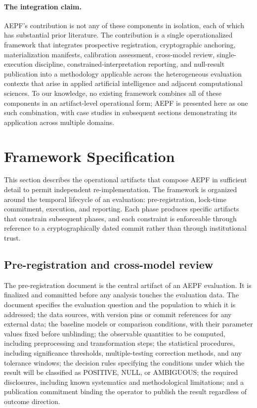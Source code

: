 \documentclass[11pt]{article}
\begin{document}
\paragraph{The integration claim.}
AEPF's contribution is not any of these components in isolation,
each of which has substantial prior literature. The contribution is
a single operationalized framework that integrates prospective
registration, cryptographic anchoring, materialization manifests,
calibration assessment, cross-model review, single-execution
discipline, constrained-interpretation reporting, and null-result
publication into a methodology applicable across the heterogeneous
evaluation contexts that arise in applied artificial intelligence
and adjacent computational sciences. To our knowledge, no existing
framework combines all of these components in an artifact-level
operational form; AEPF is presented here as one such combination,
with case studies in subsequent sections demonstrating its
application across multiple domains.

\section{Framework Specification}
\label{sec:framework-spec}

This section describes the operational artifacts that compose AEPF in
sufficient detail to permit independent re-implementation. The
framework is organized around the temporal lifecycle of an evaluation:
pre-registration, lock-time commitment, execution, and reporting. Each
phase produces specific artifacts that constrain subsequent phases,
and each constraint is enforceable through reference to a
cryptographically dated commit rather than through institutional
trust.

\subsection{Pre-registration and cross-model review}
\label{subsec:prereg-review}

The pre-registration document is the central artifact of an AEPF
evaluation. It is finalized and committed before any analysis touches
the evaluation data. The document specifies the evaluation question
and the population to which it is addressed; the data sources, with
version pins or commit references for any external data; the baseline
models or comparison conditions, with their parameter values fixed
before unblinding; the observable quantities to be computed, including
preprocessing and transformation steps; the statistical procedures,
including significance thresholds, multiple-testing correction methods,
and any tolerance windows; the decision rules specifying the
conditions under which the result will be classified as POSITIVE,
NULL, or AMBIGUOUS; the required disclosures, including known
systematics and methodological limitations; and a publication
commitment binding the operator to publish the result regardless of
outcome direction.
\end{document}

